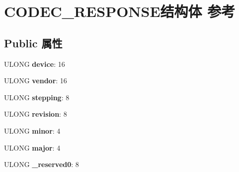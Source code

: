 \hypertarget{struct_c_o_d_e_c___r_e_s_p_o_n_s_e}{}\section{C\+O\+D\+E\+C\+\_\+\+R\+E\+S\+P\+O\+N\+S\+E结构体 参考}
\label{struct_c_o_d_e_c___r_e_s_p_o_n_s_e}
\subsection*{Public 属性}
\begin{DoxyCompactItemize}
\item 
\mbox{\label{struct_c_o_d_e_c___r_e_s_p_o_n_s_e_af154ec4b51fc318a62df9bf1bceab281}} 
U\+L\+O\+NG {\bfseries device}\+: 16
\item 
\mbox{\label{struct_c_o_d_e_c___r_e_s_p_o_n_s_e_ac7dcbe29fb4b24b112cdbb4fe2114cee}} 
U\+L\+O\+NG {\bfseries vendor}\+: 16
\item 
\mbox{\label{struct_c_o_d_e_c___r_e_s_p_o_n_s_e_aa1b8e20ac10610a38874b681f7e35a22}} 
U\+L\+O\+NG {\bfseries stepping}\+: 8
\item 
\mbox{\label{struct_c_o_d_e_c___r_e_s_p_o_n_s_e_a0db807bf3c74cb0a6ed949113ca57e21}} 
U\+L\+O\+NG {\bfseries revision}\+: 8
\item 
\mbox{\label{struct_c_o_d_e_c___r_e_s_p_o_n_s_e_a97359e0d6d43deef3ce35d1d8e8b940a}} 
U\+L\+O\+NG {\bfseries minor}\+: 4
\item 
\mbox{\label{struct_c_o_d_e_c___r_e_s_p_o_n_s_e_acf45389b3f976a6fa69ebb3d6dc6ffac}} 
U\+L\+O\+NG {\bfseries major}\+: 4
\item 
\mbox{\label{struct_c_o_d_e_c___r_e_s_p_o_n_s_e_a5acb706351774b2a0349cf1b671b9839}} 
U\+L\+O\+NG {\bfseries \+\_\+reserved0}\+: 8
\item 
\mbox{\label{struct_c_o_d_e_c___r_e_s_p_o_n_s_e_a327874f284376c3074645afc53503744}} 

\end{DoxyCompactItemize}
